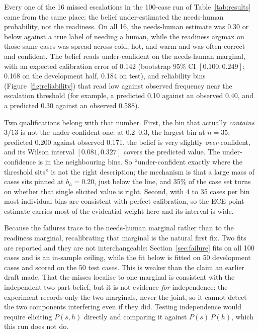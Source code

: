 \documentclass{article}
\begin{document}
Every one of the 16 missed escalations in the 100-case run of
Table~\ref{tab:results} came from the same place: the belief
under-estimated the needs-human probability, not the readiness. On all 16, the
needs-human estimate was 0.30 or below against a true label of needing a human,
while the readiness argmax on those same cases was spread across cold, hot, and
warm and was often correct and confident. The belief reads under-confident on the
needs-human marginal, with an expected calibration error of 0.142 (bootstrap 95\%
CI $[0.100, 0.249]$; 0.168 on the development half, 0.184 on test), and reliability
bins (Figure~\ref{fig:reliability}) that read low against observed frequency near
the escalation threshold (for example, a predicted 0.10 against an observed 0.40,
and a predicted 0.30 against an observed 0.588).

Two qualifications belong with that number. First, the bin that actually
\emph{contains} $3/13$ is not the under-confident one: at 0.2--0.3, the largest bin
at $n = 35$, predicted 0.200 against observed 0.171, the belief is very slightly
\emph{over}-confident, and its Wilson interval $[0.081, 0.327]$ covers the
predicted value. The under-confidence is in the neighbouring bins. So
``under-confident exactly where the threshold sits'' is not the right description;
the mechanism is that a large mass of cases sits pinned at $b_h = 0.20$, just below
the line, and 35\% of the case set turns on whether that single elicited value is
right. Second, with 4 to 35 cases per bin most individual bins are consistent with
perfect calibration, so the ECE point estimate carries most of the evidential
weight here and its interval is wide.

Because the failures trace to the needs-human marginal rather than to the readiness
marginal, recalibrating that marginal is the natural first fix. Two fits are
reported and they are not interchangeable: Section~\ref{sec:failure} fits on all
100 cases and is an in-sample ceiling, while the fit below is fitted on 50
development cases and scored on the 50 test cases. This is weaker than the claim
an earlier draft made. That the misses localise to one marginal is consistent with
the independent two-part belief, but it is not evidence \emph{for} independence: the
experiment records only the two marginals, never the joint, so it cannot detect the
two components interfering even if they did. Testing independence would require
eliciting $P(s, h)$ directly and comparing it against $P(s)\,P(h)$, which this run
does not do.
\end{document}
